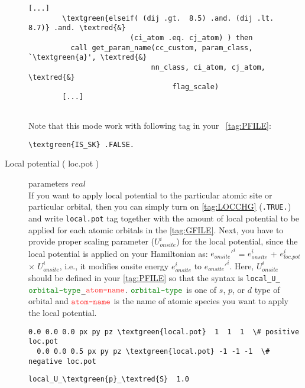 \documentclass[a4paper,12pt]{scrartcl}
\makeatletter
\def\namedlabel#1#2{\begingroup
    #2%
    \def\@currentlabel{#2}%
    \phantomsection\label{#1}\endgroup
}
\newcommand{\textred}[1]{\textcolor{red!85!white}{\texttt{#1}}}
\newcommand{\textgreen}[1]{\textcolor{green!50!black}{\texttt{#1}}}
\makeatother
\begin{document}
\begin{description}
\begin{Verbatim}[commandchars=\\\{\},gobble=4, frame=single, framesep=2mm, 
    label= source code example: get\_cc\_param.f90,
    labelposition=bottomline]
	   	[...]
        \textgreen{elseif( (dij .gt.  8.5) .and. (dij .lt.  8.7)} .and. \textred{&}
					    (ci_atom .eq. cj_atom) ) then 
    	  call get_param_name(cc_custom, param_class, `\textgreen{a}', \textred{&} 
			  			     nn_class, ci_atom, cj_atom, \textred{&}
							      flag_scale)
	   	[...]


\end{Verbatim}

		Note that this mode work with following tag in your ~\ref{tag:PFILE}:
		\begin{Verbatim}[commandchars=\\\{\}]
	 \textgreen{IS_SK} .FALSE.
		\end{Verbatim}
		
    \item[Local potential (\namedlabel{tag:param-locpot}{loc.pot})] parameters $real$ \\
		If you want to apply local potential to the particular atomic site or
		particular orbital, then you can simply turn on \ref{tag:LOCCHG}
		(\texttt{.TRUE.}) and write \texttt{local.pot} tag together with the amount of
		local potential to be applied for each atomic orbitals in the \ref{tag:GFILE}.
		Next, you have to provide proper scaling parameter ($U_{onsite}^i$) for the local 
		potential, since the local potential is applied on your Hamiltonian
		as: $e_{onsite}'^i$ = $e_{onsite}^i$ + $e_{loc.pot}^i$ $\times$ $U_{onsite}^i$,
		i.e., it modifies onsite energy $e_{onsite}^i$ to $e_{onsite}'^i$.
		Here, $U_{onsite}^i$ should be defined in your \ref{tag:PFILE} so that
		the syntax is \texttt{local\_U\_$\textgreen{orbital-type}$\_$\textred{atom-name}$}.
		$\textgreen{orbital-type}$ is one of $s$, $p$, or $d$ type of orbital and 
		$\textred{atom-name}$ is the name of atomic species you want to apply the local
		potential.
\begin{Verbatim}[commandchars=\\\{\},gobble=4, frame=single, framesep=2mm, 
    label= example of \textgreen{local.pot} tag in \ref{tag:GFILE},
    labelposition=bottomline]
  0.0 0.0 0.0 px py pz \textgreen{local.pot}  1  1  1  \# positive loc.pot
  0.0 0.0 0.5 px py pz \textgreen{local.pot} -1 -1 -1  \# negative loc.pot
\end{Verbatim}
\begin{Verbatim}[commandchars=\\\{\},gobble=4, frame=single, framesep=2mm, 
    label= example of \textgreen{local.pot} parameter  in \ref{tag:PFILE},
    labelposition=bottomline]
    local_U_\textgreen{p}_\textred{S}  1.0
\end{Verbatim}


\end{description}
\end{document}
